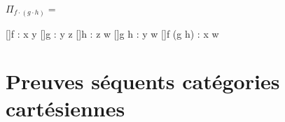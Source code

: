 \documentclass[conference]{IEEEtran}
\begin{document}
\begin{enumerate}
		$\Pi_{f \cdot (g \cdot h)} =$
		\begin{prooftree}
			[]{\Gamma \vdash f : x \rightarrow y}
			[]{\Gamma \vdash g : y \rightarrow z}
			[]{\Gamma \vdash h : z \rightarrow w}
			[]{\Gamma \vdash g \cdot h : y \rightarrow w}
			[]{\Gamma \vdash f \cdot (g \cdot h)  : x \rightarrow w}
		\end{prooftree}
	\end{enumerate}
	
	\section{Preuves séquents catégories cartésiennes} \label{seq-proof-ccat}
	
\end{document}
